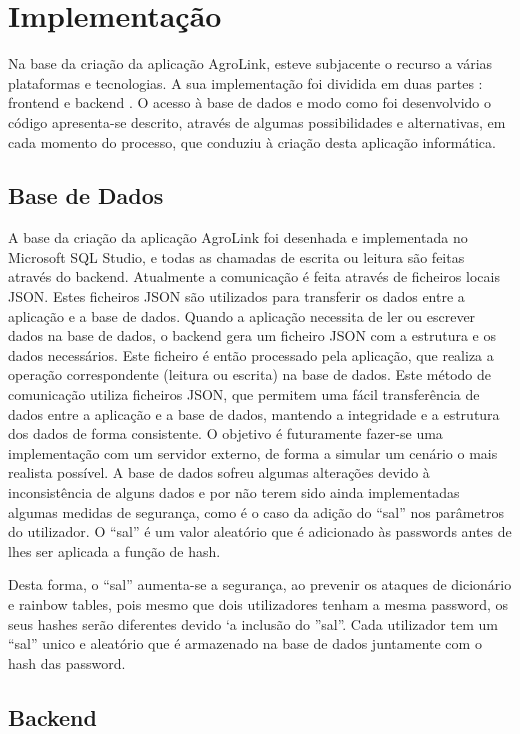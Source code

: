\documentclass[a4paper,12pt]{report}
\begin{document}
	\chapter{Implementação}
	Na base da criação da aplicação AgroLink, esteve subjacente o recurso a várias plataformas e tecnologias. A sua implementação foi dividida em duas partes	: frontend e backend . O acesso à base de dados e modo como foi desenvolvido o código apresenta-se descrito, através de algumas possibilidades e alternativas, em cada momento do processo, que conduziu à criação desta aplicação informática.

	\section{Base de Dados}
	A base da criação da aplicação AgroLink foi desenhada e implementada no Microsoft SQL Studio, e todas as chamadas de escrita ou leitura são feitas através do backend. Atualmente a
	comunicação é feita através de ficheiros locais JSON. Estes ficheiros JSON são utilizados para transferir os dados entre a aplicação e a base de dados. Quando a aplicação necessita de ler ou
	escrever dados na base de dados, o backend gera um ficheiro JSON com a estrutura e os dados necessários. Este ficheiro é então processado pela aplicação, que realiza a operação correspondente (leitura ou escrita) na base de dados. Este método de comunicação utiliza ficheiros JSON, que permitem uma fácil transferência de dados entre a aplicação e a base de dados, mantendo a integridade e a estrutura dos dados de forma consistente. O objetivo é futuramente fazer-se uma implementação com um servidor externo, de forma a simular um cenário o mais realista possível. A base de dados sofreu algumas alterações devido à inconsistência de alguns dados e por não terem sido ainda implementadas algumas medidas
	de segurança, como é o caso da adição do “sal” nos parâmetros do utilizador. O “sal” é um valor aleatório que é adicionado às passwords antes de lhes ser aplicada a função de hash.
	
	Desta forma, o “sal” aumenta-se a segurança, ao prevenir os ataques de dicionário e rainbow tables, pois mesmo que dois utilizadores tenham a mesma password, os seus hashes serão diferentes devido `a inclusão do ”sal”. Cada utilizador tem um “sal” unico e aleatório que é armazenado na base de dados juntamente com o hash das password.
	\section{Backend}
\end{document}
